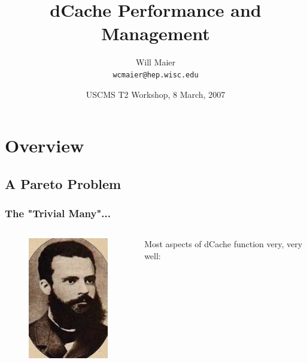 \documentclass{beamer}
\title{dCache Performance and Management}
\author[Will Maier]{Will Maier \\ \texttt{wcmaier@hep.wisc.edu}}
\institute[Wisconsin]{University of Wisconsin - High Energy Physics}
\date[8 March, 2007]{USCMS T2 Workshop, 8 March, 2007}
\begin{document}
\begin{frame}
    \titlepage
\end{frame}

\section{Overview}
\subsection{A Pareto Problem}

\begin{frame}
\frametitle{The "Trivial Many"...}
\begin{columns}[t]
\begin{column}{.25\textwidth}
    \begin{figure}
        \includegraphics*[width=.8\textwidth]{Graphics/Pareto.jpg}
    \end{figure}
\end{column}
\begin{column}{.75\textwidth}
    \large{Most aspects of dCache function very, very well:}

\end{column}
\end{columns}
\end{frame}
\end{document}
